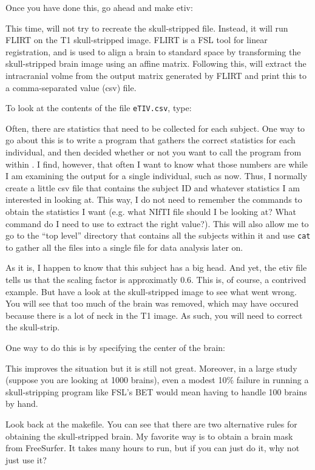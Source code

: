 Once you have done this, go ahead and make etiv:

This time, \maken{} will not try to recreate the skull-stripped file. Instead, it will run FLIRT on the T1 skull-stripped image. FLIRT is a FSL tool for linear registration, and is used to align a brain to standard space by transforming the skull-stripped brain image using an affine matrix. Following this, \maken{} will extract the intracranial volme from the output matrix generated by FLIRT and print this to a comma-separated value (csv) file.

To look at the contents of the file \texttt{eTIV.csv}, type:

Often, there are statistics that need to be collected for each subject. One way to go about this is to write a program that gathers the correct statistics for each individual, and then decided whether or not you want to call the program from within \maken{}. I find, however, that often I want to know what those numbers are while I am examining the output for a single individual, such as now. Thus, I normally create a little csv file that contains the subject ID and whatever statistics I am interested in looking at. This way, I do not need to remember the commands to obtain the statistics I want (e.g. what NIfTI file should I be looking at? What command do I need to use to extract the right value?). This will also allow me to go to the ``top level'' directory that contains all the subjects within it and use \texttt{cat} to gather all the files into a single file for data analysis later on.

As it is, I happen to know that this subject has a big head. And yet, the etiv file tells us that the scaling factor is approximatly 0.6. This is, of course, a contrived example. But have a look at the skull-stripped image to see what went wrong. You will see that too
much of the brain was removed, which may have occured because there is a lot of neck in the T1 image.
As such, you will need to correct the skull-strip.

One way to do this is by specifying the center of the brain:

This improves the situation but it is still not great. Moreover, in a large
study (suppose you are looking at 1000 brains), even a modest 10\%
failure in running a skull-stripping program like FSL's BET would mean having to handle 100 brains by hand.  

Look back at the makefile. You can see that there are two alternative rules for
obtaining the skull-stripped brain. My favorite way is to obtain a brain
mask from FreeSurfer. It takes many hours to run, but if you can just do
it, why not just use it? %

